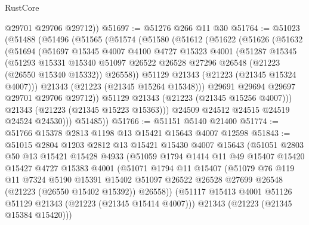 \begin{lexlean}{RustCore}
\begin{coremodule}
        @29701
        @29706
        @29712))
@51697 := @51276 @266 @11 @30
@51764 := @51023
    (@51488
      (@51496
        (@51565
          (@51574
            (@51580
              (@51612
                (@51622
                  (@51626
                    (@51632
                      (@51694
                        (@51697
                          @15345
                          @4007
                          @4100
                          @4727
                          @15323
                          @4001
                          (@51287
                            @15345
                            (@51293
                              @15331
                              @15340
                              @51097
                              @26522
                              @26528
                              @27296
                              @26548
                              (@21223 (@26550 @15340 @15332))
                              @26558))
                          @51129
                          @21343
                          (@21223 (@21345 @15324 @4007)))
                        @21343
                        (@21223 (@21345 @15264 @15348)))
                      @29691
                      @29694
                      @29697
                      @29701
                      @29706
                      @29712))
                  @51129
                  @21343
                  (@21223 (@21345 @15256 @4007)))
                @21343
                (@21223 (@21345 @15223 @15363)))
              @24509
              @24512
              @24515
              @24519
              @24524
              @24530)))
        @51485))
@51766 := @51151 @5140 @21400
@51774 := @51766 @15378 @2813 @1198 @13 @15421 @15643 @4007 @12598
@51843 := @51015
    @2804
    @1203
    @2812
    @13
    @15421
    @15430
    @4007
    @15643
    (@51051
      @2803
      @50
      @13
      @15421
      @15428
      @4933
      (@51059
        @1794
        @1414
        @11
        @49
        @15407
        @15420
        @15427
        @4727
        @15383
        @4001
        (@51071
          @1794
          @11
          @15407
          (@51079
            @76
            @119
            @11
            @7324
            @5190
            @15391
            @15402
            @51097
            @26522
            @26528
            @27699
            @26548
            (@21223 (@26550 @15402 @15392))
            @26558))
        (@51117 @15413 @4001 @51126 @51129 @21343 (@21223 (@21345 @15414 @4007)))
        @21343
        (@21223 (@21345 @15384 @15420)))

\end{coremodule}
\end{lexlean}

